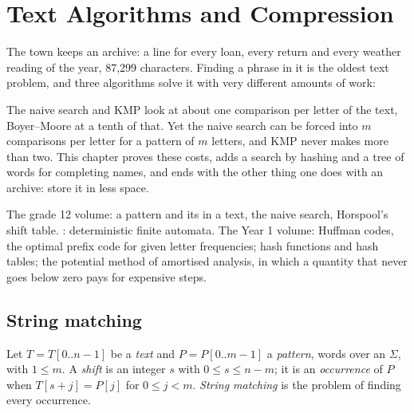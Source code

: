 \chapter{Text Algorithms and Compression}\label{ch:b2:text-algorithms}

The town keeps an archive: a line for every loan, every return and every weather reading of the year, 87,299
characters. Finding a phrase in it is the oldest text problem, and three algorithms solve it with very different
amounts of work:

\label{lst:b2:text-algorithms:search}

\label{out:b2:text-algorithms:search}

The naive search and KMP look at about one comparison per letter of the text, Boyer--Moore at a tenth of that. Yet the
naive search can be forced into $m$ comparisons per letter for a pattern of $m$ letters, and KMP never makes more than
two. This chapter proves these costs, adds a search by hashing and a tree of words for completing names, and ends with
the other thing one does with an archive: store it in less space.

\begin{recall}
The grade 12 volume: a pattern and its  in a text, the naive search, Horspool's shift table. :
deterministic finite automata. The Year 1 volume: Huffman codes, the optimal prefix code for given letter frequencies;
hash functions and hash tables; the potential method of amortised analysis, in which a quantity that never goes below
zero pays for expensive steps.
\end{recall}

\section{String matching}\label{sec:b2:text-algorithms:matching}

\begin{definition}\label{def:b2:text-algorithms:matching}
Let $T = T[0..n-1]$ be a \emph{text} and $P = P[0..m-1]$ a \emph{pattern}, words over an  $\Sigma$, with $1 \leq
m$. A \emph{shift} is an integer $s$ with $0 \leq s \leq n - m$; it is an \emph{occurrence} of $P$ when $T[s + j] = P[j]$ for $0 \leq j < m$. \emph{String matching} is the problem
of finding every occurrence.
\end{definition}


